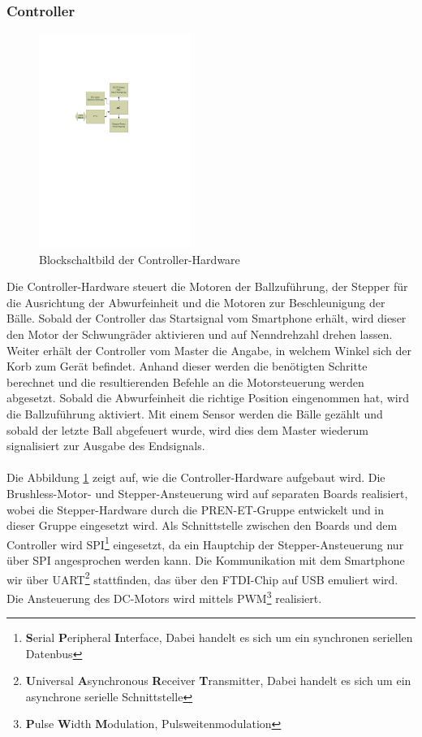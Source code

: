 \subsubsection{Controller}
\label{sec:Controller}
	\begin{figure}
		\centering
		\includegraphics[width=0.44\textwidth,clip,trim= 50mm 16cm 86mm 6.8cm]
			{Enddokumentation/Loesungskonzept/Bilder/Blockschaltbild_Controller.pdf}
		\caption{Blockschaltbild der Controller-Hardware}
		\label{fig:Blockschaltbild_Controller}
	\end{figure}
	Die Controller-Hardware steuert die Motoren der Ballzuführung, der Stepper für die Ausrichtung 
	der Abwurfeinheit und die Motoren zur Beschleunigung der Bälle. Sobald der Controller das Startsignal vom Smartphone erhält, 
	wird dieser den Motor der Schwungräder aktivieren und auf Nenndrehzahl drehen lassen. Weiter erhält der Controller vom Master die Angabe, 
	in welchem Winkel sich der Korb zum Gerät befindet. Anhand dieser werden die benötigten Schritte berechnet und die resultierenden Befehle 
	an die Motorsteuerung werden abgesetzt. Sobald die Abwurfeinheit die richtige Position eingenommen hat, wird die Ballzuführung aktiviert. 
	Mit einem Sensor werden die Bälle gezählt und sobald der letzte Ball abgefeuert wurde, wird dies dem Master wiederum signalisiert zur Ausgabe des Endsignals.\\
	\\	
	Die Abbildung \ref{fig:Blockschaltbild_Controller} zeigt auf, wie die Controller-Hardware aufgebaut wird. 
	Die Brushless-Motor- und Stepper-Ansteuerung wird auf separaten Boards realisiert, wobei die Stepper-Hardware durch die PREN-ET-Gruppe
	entwickelt und in dieser Gruppe eingesetzt wird. Als Schnittstelle zwischen den Boards und dem Controller wird SPI\footnote{\textbf{S}erial \textbf{P}eripheral \textbf{I}nterface, Dabei handelt es sich um ein synchronen seriellen Datenbus} eingesetzt, 
	da ein Hauptchip der Stepper-Ansteuerung nur über SPI angesprochen werden kann. Die Kommunikation mit dem Smartphone wir über UART\footnote{\textbf{U}niversal \textbf{A}synchronous \textbf{R}eceiver \textbf{T}ransmitter, Dabei handelt es sich um ein asynchrone serielle Schnittstelle} stattfinden, 
	das über den FTDI-Chip auf USB emuliert wird. Die Ansteuerung des DC-Motors wird mittels PWM\footnote{\textbf{P}ulse \textbf{W}idth \textbf{M}odulation, Pulsweitenmodulation} realisiert.